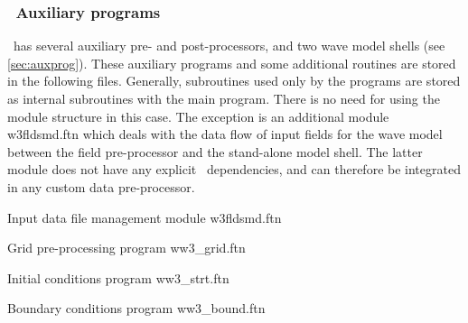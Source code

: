 \vsssub
\subsubsection{~Auxiliary programs} \label{sec:aux_mod}
\vsssub

\vspace{\baselineskip}
\noindent
\ww\ has several auxiliary pre- and post-processors, and two wave model shells
(see \para\ref{sec:auxprog}). These auxiliary programs and some additional routines
are stored in the following files. Generally, subroutines used only by the
programs are stored as internal subroutines with the main program. There is no
need for using the module structure in this case. The exception is an
additional module {\file w3fldsmd.ftn} which deals with the data flow of input
fields for the wave model between the field pre-processor and the stand-alone
model shell. The latter module does not have any explicit \ws\ dependencies,
and can therefore be integrated in any custom data pre-processor.


% 

\vspace{\baselineskip} 
\noindent
Input data file management module \hfill {\file w3fldsmd.ftn}

\begin{flisti}
\end{flisti}

\noindent
Grid pre-processing program \hfill {\file ww3\_grid.ftn}

\begin{flisti}
\end{flisti}

\noindent
Initial conditions program \hfill {\file ww3\_strt.ftn}

\begin{flisti}
\end{flisti}

\noindent
Boundary conditions program \hfill {\file ww3\_bound.ftn}

